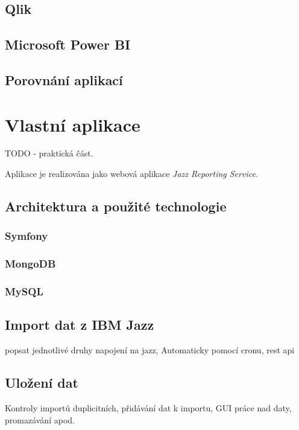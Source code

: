 \documentclass[czech,master,public,dept460,male,cpdeclaration,oneside]{diploma}
\begin{document}
\subsection{Qlik}

\subsection{Microsoft Power BI}

\subsection{Porovnání aplikací}

\newpage %
\section{Vlastní aplikace}
TODO - praktická část.

Aplikace je realizována jako webová aplikace \textit{Jazz Reporting Service}.

\subsection{Architektura a použité technologie}

\subsubsection{Symfony}

\subsubsection{MongoDB}

\subsubsection{MySQL}


\subsection{Import dat z IBM Jazz}
popsat jednotlivé druhy napojení na jazz, Automaticky pomocí cronu, rest api 

\subsection{Uložení dat}
Kontroly importů duplicitních, přidávání dat k importu, GUI práce nad daty, promazávání apod.
\end{document}
